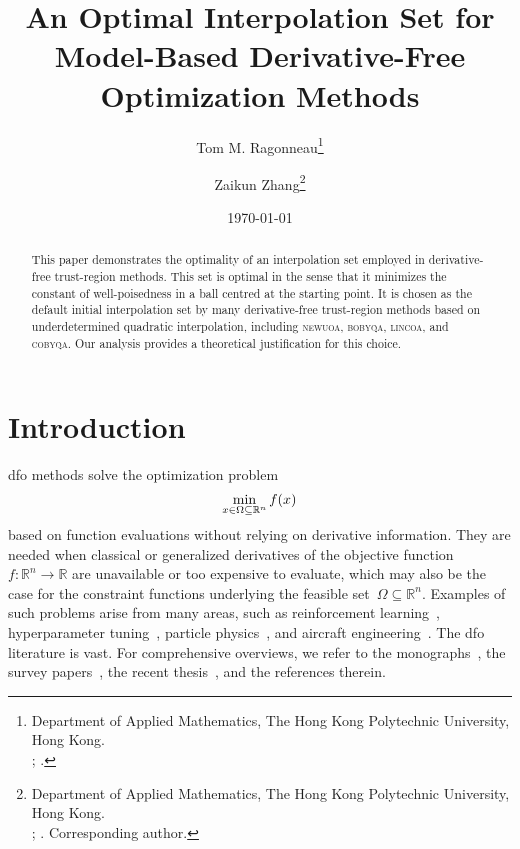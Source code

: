 \documentclass{article}
\title{An Optimal Interpolation Set for Model-Based Derivative-Free Optimization Methods}
\author{
    Tom M. Ragonneau\thanks{
        Department of Applied Mathematics, The Hong Kong Polytechnic University, Hong Kong.\\
        \email{tom.ragonneau@polyu.edu.hk}; \orcid{0000-0003-2717-2876}.
    } \and
    Zaikun Zhang\thanks{
        Department of Applied Mathematics, The Hong Kong Polytechnic University, Hong Kong.\\
        \email{zaikun.zhang@polyu.edu.hk}; \orcid{0000-0001-8934-8190}. Corresponding author.
    }
}
\date{\today}
\numberwithin{equation}{section}
\theoremstyle{definition}
\theoremstyle{plain}
\theoremstyle{remark}
\newcommand*{\fset}{\Omega}
\newcommand*{\obj}{f}
\newcommand*{\R}{\mathbb{R}}
\newcommand*{\solvername}[1]{\textsc{#1}\xspace}
\begin{document}
\maketitle

\begin{abstract}
    This paper demonstrates the optimality of an interpolation set employed in derivative-free trust-region methods.
    This set is optimal in the sense that it minimizes the constant of well-poisedness in a ball centred at the starting point.
    It is chosen as the default initial interpolation set by many derivative-free trust-region methods based on underdetermined quadratic interpolation, including \solvername{newuoa}, \solvername{bobyqa}, \solvername{lincoa}, and \solvername{cobyqa}.
    Our analysis provides a theoretical justification for this choice.
\end{abstract}



\section{Introduction}

\Gls{dfo} methods solve the optimization problem
\begin{equation}
    \label{eq:nlp}
    \min_{x \in \fset \subseteq \R^n} \obj(x)\\
\end{equation}
based on function evaluations without relying on derivative information.
They are needed when classical or generalized derivatives of the objective function~$\obj \colon \R^n \to \R$ are unavailable or too expensive to evaluate, which may also be the case for the constraint functions underlying the feasible set~$\fset \subseteq \R^n$.
Examples of such problems arise from many areas, such as reinforcement learning~\cite{Qian_Yu_2021}, hyperparameter tuning~\cite{Ghanbari_Scheinberg_2017}, particle physics~\cite{Eldred_Etal_2022}, and aircraft engineering~\cite{Gazaix_Etal_2019}.
The \gls{dfo} literature is vast. For comprehensive overviews, we refer to the monographs~\cite{Conn_Scheinberg_Vicente_2009,Audet_Hare_2017}, the survey papers~\cite{Powell_1975,Powell_1998,Rios_Sahinidis_2013,Custodio_Scheinberg_Vicente_2017,Larson_Menickelly_Wild_2019}, the recent thesis~\cite{Ragonneau_2022}, and the references therein.
\end{document}
